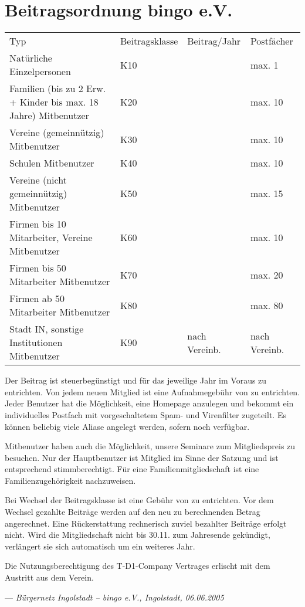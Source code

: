 \section{Beitragsordnung bingo e.V.} \label{sec:beitragsordnung}
\begin{tabu}{X[3]XX[r]X}
	\rowfont{\bfseries}
	Typ                                                             & Beitrags\-klasse& Beitrag/Jahr      & Postfächer \\
	Natürliche Einzelpersonen                                       & K10             &         & max. 1 \\
	Familien (bis zu 2 Erw. + Kinder bis max. 18 Jahre) Mitbenutzer & K20             &         & max. 10\\
	Vereine (gemeinnützig) Mitbenutzer                              & K30             &         & max. 10\\
	Schulen Mitbenutzer                                             & K40             &         & max. 10\\
	Vereine (nicht gemeinnützig) Mitbenutzer                        & K50             &        & max. 15\\
	Firmen bis 10 Mitarbeiter, Vereine Mitbenutzer                  & K60             &        & max. 10\\
	Firmen bis 50 Mitarbeiter Mitbenutzer                           & K70             &        & max. 20\\
	Firmen ab 50 Mitarbeiter Mitbenutzer                            & K80             &        & max. 80\\
	Stadt IN, sonstige Institutionen Mitbenutzer                    & K90             & nach Vereinb.     & nach Vereinb.\\
\end{tabu}

Der Beitrag ist steuerbegünstigt und für das jeweilige Jahr im Voraus zu entrichten.
Von jedem neuen Mitglied ist eine Aufnahmegebühr von  zu entrichten.
Jeder Benutzer hat die Möglichkeit, eine Homepage anzulegen
und bekommt ein individuelles Postfach mit vorgeschaltetem Spam- und Virenfilter zugeteilt.
Es können beliebig viele Aliase angelegt werden, sofern noch verfügbar.

Mitbenutzer haben auch die Möglichkeit, unsere Seminare zum Mitgliedspreis zu besuchen.
Nur der Hauptbenutzer ist Mitglied im Sinne der Satzung und ist entsprechend stimmberechtigt.
Für eine Familienmitgliedschaft ist eine Familienzugehörigkeit nachzuweisen.

Bei Wechsel der Beitragsklasse ist eine Gebühr von   zu entrichten.
Vor dem Wechsel gezahlte Beiträge werden auf den neu zu berechnenden Betrag angerechnet.
Eine Rückerstattung rechnerisch zuviel bezahlter Beiträge erfolgt nicht.
Wird die Mitgliedschaft nicht bis 30.11. zum Jahresende gekündigt,
verlängert sie sich automatisch um ein weiteres Jahr.

Die Nutzungsberechtigung des T-D1-Company Vertrages erlischt mit dem Austritt aus dem Verein.

\hfill --- \textit{Bürgernetz Ingolstadt -- bingo e.V., Ingolstadt, 06.06.2005}
\newpage
